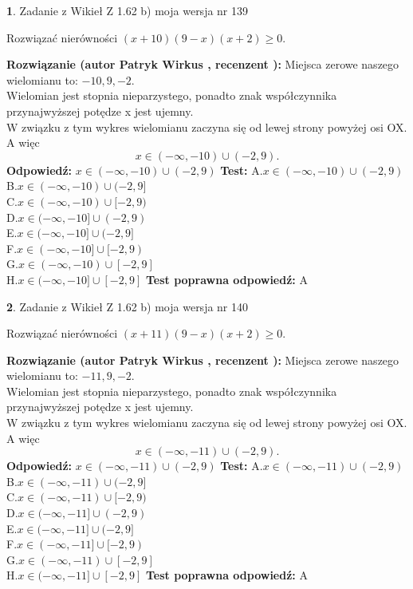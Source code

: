 \documentclass[12pt, a4paper]{article}
\theoremstyle{definition} %
\newtheorem{zad}{}
\newcommand{\zadStart}[1]{\begin{zad}#1\newline}
\newcommand{\zadStop}{\end{zad}}
\newcommand{\rozwStart}[2]{\noindent \textbf{Rozwiązanie (autor #1 , recenzent #2): }\newline}
\newcommand{\rozwStop}{\newline}
\newcommand{\odpStart}{\noindent \textbf{Odpowiedź:}\newline}
\newcommand{\odpStop}{\newline}
\newcommand{\testStart}{\noindent \textbf{Test:}\newline}
\newcommand{\testStop}{\newline}
\newcommand{\kluczStart}{\noindent \textbf{Test poprawna odpowiedź:}\newline}
\newcommand{\kluczStop}{\newline}
\begin{document}
\zadStart{Zadanie z Wikieł Z 1.62 b) moja wersja nr 139}

Rozwiązać nierówności $(x+10)(9-x)(x+2)\ge0$.
\zadStop
\rozwStart{Patryk Wirkus}{}
Miejsca zerowe naszego wielomianu to: $-10, 9, -2$.\\
Wielomian jest stopnia nieparzystego, ponadto znak współczynnika przy\linebreak najwyższej potędze x jest ujemny.\\ W związku z tym wykres wielomianu zaczyna się od lewej strony powyżej osi OX. A więc $$x \in (-\infty,-10) \cup (-2,9).$$
\rozwStop
\odpStart
$x \in (-\infty,-10) \cup (-2,9)$
\odpStop
\testStart
A.$x \in (-\infty,-10) \cup (-2,9)$\\
B.$x \in (-\infty,-10) \cup (-2,9]$\\
C.$x \in (-\infty,-10) \cup [-2,9)$\\
D.$x \in (-\infty,-10] \cup (-2,9)$\\
E.$x \in (-\infty,-10] \cup (-2,9]$\\
F.$x \in (-\infty,-10] \cup [-2,9)$\\
G.$x \in (-\infty,-10) \cup [-2,9]$\\
H.$x \in (-\infty,-10] \cup [-2,9]$
\testStop
\kluczStart
A
\kluczStop



\zadStart{Zadanie z Wikieł Z 1.62 b) moja wersja nr 140}

Rozwiązać nierówności $(x+11)(9-x)(x+2)\ge0$.
\zadStop
\rozwStart{Patryk Wirkus}{}
Miejsca zerowe naszego wielomianu to: $-11, 9, -2$.\\
Wielomian jest stopnia nieparzystego, ponadto znak współczynnika przy\linebreak najwyższej potędze x jest ujemny.\\ W związku z tym wykres wielomianu zaczyna się od lewej strony powyżej osi OX. A więc $$x \in (-\infty,-11) \cup (-2,9).$$
\rozwStop
\odpStart
$x \in (-\infty,-11) \cup (-2,9)$
\odpStop
\testStart
A.$x \in (-\infty,-11) \cup (-2,9)$\\
B.$x \in (-\infty,-11) \cup (-2,9]$\\
C.$x \in (-\infty,-11) \cup [-2,9)$\\
D.$x \in (-\infty,-11] \cup (-2,9)$\\
E.$x \in (-\infty,-11] \cup (-2,9]$\\
F.$x \in (-\infty,-11] \cup [-2,9)$\\
G.$x \in (-\infty,-11) \cup [-2,9]$\\
H.$x \in (-\infty,-11] \cup [-2,9]$
\testStop
\kluczStart
A
\kluczStop
\end{document}
